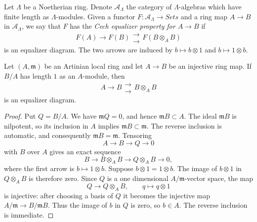 \begin{definition}
\label{definition-artinian-algebra-functor-cech}
Let $\Lambda$ be a Noetherian ring. Denote $\mathcal{A}_\Lambda$ the category
of $\Lambda$-algebras which have finite length as $\Lambda$-modules. Given a
functor $F : \mathcal{A}_\Lambda \to \textit{Sets}$ and a ring map
$A \to B$ in $\mathcal{A}_\Lambda$, we say that $F$ has the
{\it Cech equalizer property for $A \to B$} if
$$
F(A) \longrightarrow F(B)
\mathrel{\substack{\longrightarrow \\[-0.6ex] \longrightarrow}}
F(B \otimes_A B)
$$
is an equalizer diagram. The two arrows are induced by
$b \mapsto b \otimes 1$ and $b \mapsto 1 \otimes b$.
\end{definition}

\begin{lemma}
\label{lemma-length-one-cech-equalizer}
Let $(A, \mathfrak m)$ be an Artinian local ring and let $A \to B$ be an
injective ring map. If $B/A$ has length $1$ as an $A$-module, then
$$
A \longrightarrow B
\mathrel{\substack{\longrightarrow \\[-0.6ex] \longrightarrow}}
B \otimes_A B
$$
is an equalizer diagram.
\end{lemma}

\begin{proof}
Put $Q = B/A$. We have $\mathfrak mQ = 0$, and hence
$\mathfrak mB \subset A$. The ideal $\mathfrak mB$ is nilpotent, so its
inclusion in $A$ implies $\mathfrak mB \subset \mathfrak m$. The reverse
inclusion is automatic, and consequently $\mathfrak mB = \mathfrak m$.
Tensoring
$$
A \longrightarrow B \longrightarrow Q \longrightarrow 0
$$
with $B$ over $A$ gives an exact sequence
$$
B \longrightarrow B \otimes_A B \longrightarrow Q \otimes_A B
\longrightarrow 0,
$$
where the first arrow is $b \mapsto 1 \otimes b$.
Suppose $b \otimes 1 = 1 \otimes b$. The image of $b \otimes 1$ in
$Q \otimes_A B$ is therefore zero. Since $Q$ is a one dimensional
$A/\mathfrak m$-vector space, the map
$$
Q \longrightarrow Q \otimes_A B, \qquad q \longmapsto q \otimes 1
$$
is injective: after choosing a basis of $Q$ it becomes the injective map
$A/\mathfrak m \to B/\mathfrak mB$. Thus the image of $b$ in $Q$ is zero,
so $b \in A$. The reverse inclusion is immediate.
\end{proof}

